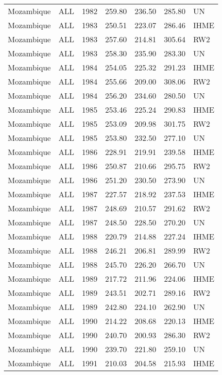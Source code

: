 \begin{longtable}{lllrrrl}
  Mozambique & ALL & 1982 & 259.80 & 236.50 & 285.80 & UN \\ 
  Mozambique & ALL & 1983 & 250.51 & 223.07 & 286.46 & IHME \\ 
  Mozambique & ALL & 1983 & 257.60 & 214.81 & 305.64 & RW2 \\ 
  Mozambique & ALL & 1983 & 258.30 & 235.90 & 283.30 & UN \\ 
  Mozambique & ALL & 1984 & 254.05 & 225.32 & 291.23 & IHME \\ 
  Mozambique & ALL & 1984 & 255.66 & 209.00 & 308.06 & RW2 \\ 
  Mozambique & ALL & 1984 & 256.20 & 234.60 & 280.50 & UN \\ 
  Mozambique & ALL & 1985 & 253.46 & 225.24 & 290.83 & IHME \\ 
  Mozambique & ALL & 1985 & 253.09 & 209.98 & 301.75 & RW2 \\ 
  Mozambique & ALL & 1985 & 253.80 & 232.50 & 277.10 & UN \\ 
  Mozambique & ALL & 1986 & 228.91 & 219.91 & 239.58 & IHME \\ 
  Mozambique & ALL & 1986 & 250.87 & 210.66 & 295.75 & RW2 \\ 
  Mozambique & ALL & 1986 & 251.20 & 230.50 & 273.90 & UN \\ 
  Mozambique & ALL & 1987 & 227.57 & 218.92 & 237.53 & IHME \\ 
  Mozambique & ALL & 1987 & 248.69 & 210.57 & 291.62 & RW2 \\ 
  Mozambique & ALL & 1987 & 248.50 & 228.50 & 270.20 & UN \\ 
  Mozambique & ALL & 1988 & 220.79 & 214.88 & 227.24 & IHME \\ 
  Mozambique & ALL & 1988 & 246.21 & 206.81 & 289.99 & RW2 \\ 
  Mozambique & ALL & 1988 & 245.70 & 226.20 & 266.70 & UN \\ 
  Mozambique & ALL & 1989 & 217.72 & 211.96 & 224.06 & IHME \\ 
  Mozambique & ALL & 1989 & 243.51 & 202.71 & 289.16 & RW2 \\ 
  Mozambique & ALL & 1989 & 242.80 & 224.10 & 262.90 & UN \\ 
  Mozambique & ALL & 1990 & 214.22 & 208.68 & 220.13 & IHME \\ 
  Mozambique & ALL & 1990 & 240.70 & 200.93 & 286.30 & RW2 \\ 
  Mozambique & ALL & 1990 & 239.70 & 221.80 & 259.10 & UN \\ 
  Mozambique & ALL & 1991 & 210.03 & 204.58 & 215.93 & IHME \\ 

\end{longtable}
